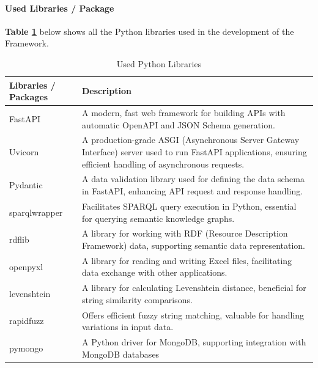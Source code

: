        \paragraph{Used Libraries / Package}
        \textbf{Table \ref{tab:python-libs}} below shows all the Python libraries used in the development of the Framework.
        
        \begin{table}[h]
            \centering
    	    {
    	    \begin{tabular}{ | m{2.5cm} | m{12cm} | }
                \hline
                \rowcolor{teal!30} Libraries / Packages & Description \\
                
                \hline
                FastAPI & A modern, fast web framework for building APIs with automatic OpenAPI and JSON Schema generation.\\

                \hline
                Uvicorn & A production-grade ASGI (Asynchronous Server Gateway Interface) server used to run FastAPI applications, ensuring efficient handling of asynchronous requests.\\

                \hline
                Pydantic & A data validation library used for defining the data schema in FastAPI, enhancing API request and response handling.\\

                \hline
                sparqlwrapper & Facilitates SPARQL query execution in Python, essential for querying semantic knowledge graphs.\\

                \hline
                rdflib & A library for working with RDF (Resource Description Framework) data, supporting semantic data representation.\\

                \hline
                openpyxl & A library for reading and writing Excel files, facilitating data exchange with other applications.\\

                \hline
                levenshtein & A library for calculating Levenshtein distance, beneficial for string similarity comparisons.\\

                \hline
                rapidfuzz & Offers efficient fuzzy string matching, valuable for handling variations in input data.\\

                \hline
                pymongo & A Python driver for MongoDB, supporting integration with MongoDB databases\\
                
                \hline
            \end{tabular}}
            \caption{\label{tab:python-libs} Used Python Libraries}
        \end{table}
    
